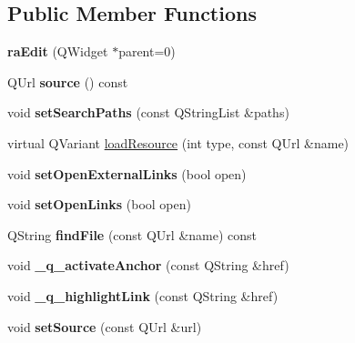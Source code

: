 \subsection*{Public Member Functions}
\begin{DoxyCompactItemize}
\item 
\hypertarget{classraEdit_a5d054325340671ea55dbcd3a538c2725}{
{\bfseries raEdit} (QWidget $\ast$parent=0)}
\label{classraEdit_a5d054325340671ea55dbcd3a538c2725}

\item 
\hypertarget{classraEdit_a28fd8d4d4b4eeeed8276e1d09461d824}{
QUrl {\bfseries source} () const }
\label{classraEdit_a28fd8d4d4b4eeeed8276e1d09461d824}

\item 
\hypertarget{classraEdit_ad48742722c9b2c1a6fb687b1610d1402}{
void {\bfseries setSearchPaths} (const QStringList \&paths)}
\label{classraEdit_ad48742722c9b2c1a6fb687b1610d1402}

\item 
virtual QVariant \hyperlink{classraEdit_a88d6a5ed8345f496dfa43a78a9240d1a}{loadResource} (int type, const QUrl \&name)
\item 
\hypertarget{classraEdit_ac3b7b0e1430b2b8cfe5c37e75955b729}{
void {\bfseries setOpenExternalLinks} (bool open)}
\label{classraEdit_ac3b7b0e1430b2b8cfe5c37e75955b729}

\item 
\hypertarget{classraEdit_ace8a8d6ffa8ad676e0affd4495885277}{
void {\bfseries setOpenLinks} (bool open)}
\label{classraEdit_ace8a8d6ffa8ad676e0affd4495885277}

\item 
\hypertarget{classraEdit_a5b6b0f207f4962738b8fb1774da52d65}{
QString {\bfseries findFile} (const QUrl \&name) const }
\label{classraEdit_a5b6b0f207f4962738b8fb1774da52d65}

\item 
\hypertarget{classraEdit_a85bd0a31357f5a1c6d738d2041da495f}{
void {\bfseries \_\-q\_\-activateAnchor} (const QString \&href)}
\label{classraEdit_a85bd0a31357f5a1c6d738d2041da495f}

\item 
\hypertarget{classraEdit_a458af65b45760161d41b1def5f46444c}{
void {\bfseries \_\-q\_\-highlightLink} (const QString \&href)}
\label{classraEdit_a458af65b45760161d41b1def5f46444c}

\item 
\hypertarget{classraEdit_a8ba687ccd78c096ef0b9577a8238bb3f}{
void {\bfseries setSource} (const QUrl \&url)}
\label{classraEdit_a8ba687ccd78c096ef0b9577a8238bb3f}


\end{DoxyCompactItemize}
